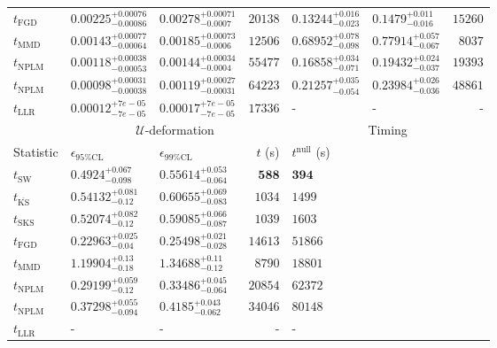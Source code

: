 \begin{tabular}{l|llr|llr}
	$t_{\mathrm{FGD}}$ & $0.00225_{-0.00086}^{+0.00076}$ & $0.00278_{-0.0007}^{+0.00071}$ & $20138$ & ${\mathbf{0.13244_{-0.023}^{+0.016}}}$ & ${\mathbf{0.1479_{-0.016}^{+0.011}}}$ & $15260$ \\
	$t_{\mathrm{MMD}}$ & ${\mathbf{0.00143_{-0.00064}^{+0.00077}}}$ & ${\mathbf{0.00185_{-0.0006}^{+0.00073}}}$ & $12506$ & $0.68952_{-0.098}^{+0.078}$ & $0.77914_{-0.067}^{+0.057}$ & $8037$ \\
\rowcolor{red!35}	$t_{\mathrm{NPLM}}$ & $0.00118_{-0.00053}^{+0.00038}$ & $0.00144_{-0.0004}^{+0.00034}$ & $55477$ & $0.16858_{-0.071}^{+0.034}$ & $0.19432_{-0.037}^{+0.024}$ & $19393$ \\
\rowcolor{blue!35}	$t_{\mathrm{NPLM}}$ & $0.00098_{-0.00038}^{+0.00031}$ & $0.00119_{-0.00031}^{+0.00027}$ & $64223$ & $0.21257_{-0.054}^{+0.035}$ & $0.23984_{-0.036}^{+0.026}$ & $48861$ \\
	$t_{\mathrm{LLR}}$ & $0.00012_{-7e-05}^{+7e-05}$ & $0.00017_{-7e-05}^{+7e-05}$ & $17336$ & - & - & - \\
	\toprule
	\multicolumn{1}{c}{} & \multicolumn{3}{c}{$\mathcal{U}$-deformation} & \multicolumn{3}{c}{Timing} \\
	Statistic & $\epsilon_{95\%\mathrm{CL}}$ & $\epsilon_{99\%\mathrm{CL}}$ & $t$ (s) & $t^{\mathrm{null}}$ (s) \\
	\midrule
	$t_{\mathrm{SW}}$ & $0.4924_{-0.098}^{+0.067}$ & $0.55614_{-0.064}^{+0.053}$ & ${\mathbf{588}}$ & ${\mathbf{394}}$ \\
	$t_{\overline{\mathrm{KS}}}$ & $0.54132_{-0.12}^{+0.081}$ & $0.60655_{-0.083}^{+0.069}$ & $1034$ & $1499$ \\
	$t_{\mathrm{SKS}}$ & $0.52074_{-0.12}^{+0.082}$ & $0.59085_{-0.087}^{+0.066}$ & $1039$ & $1603$ \\
	$t_{\mathrm{FGD}}$ & ${\mathbf{0.22963_{-0.04}^{+0.025}}}$ & ${\mathbf{0.25498_{-0.028}^{+0.021}}}$ & $14613$ & $51866$ \\
	$t_{\mathrm{MMD}}$ & $1.19904_{-0.18}^{+0.13}$ & $1.34688_{-0.12}^{+0.11}$ & $8790$ & $18801$ \\
\rowcolor{red!35}	$t_{\mathrm{NPLM}}$ & $0.29199_{-0.12}^{+0.059}$ & $0.33486_{-0.064}^{+0.045}$ & $20854$ & $62372$ \\
\rowcolor{blue!35}	$t_{\mathrm{NPLM}}$ & $0.37298_{-0.094}^{+0.055}$ & $0.4185_{-0.062}^{+0.043}$ & $34046$ & $80148$ \\
	$t_{\mathrm{LLR}}$ & - & - & - & - \\
	\bottomrule
\end{tabular}